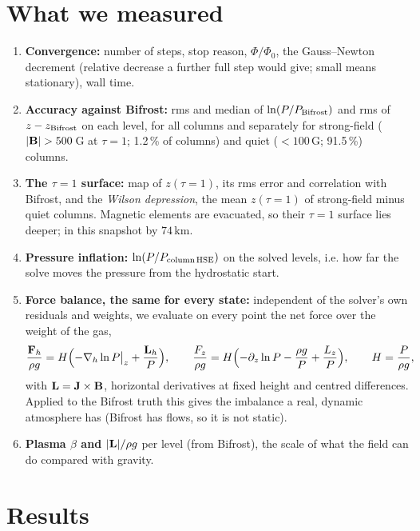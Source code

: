 \section{What we measured}
\begin{enumerate}
\item \textbf{Convergence:} number of steps, stop reason, $\Phi/\Phi_0$, the Gauss--Newton decrement (relative decrease a
further full step would give; small means stationary), wall time.
\item \textbf{Accuracy against Bifrost:} rms and median of $\ln(P/P_{\rm Bifrost})$ and rms of $z-z_{\rm Bifrost}$ on each
level, for all columns and separately for strong-field ($|\B|>500$\,G at $\tau=1$; 1.2\,\% of columns) and quiet
($<100$\,G; 91.5\,\%) columns.
\item \textbf{The $\tau=1$ surface:} map of $z(\tau=1)$, its rms error and correlation with Bifrost, and the \emph{Wilson
depression}, the mean $z(\tau=1)$ of strong-field minus quiet columns. Magnetic elements are evacuated, so their $\tau=1$
surface lies deeper; in this snapshot by $74$\,km.
\item \textbf{Pressure inflation:} $\ln(P/P_{\rm column\,HSE})$ on the solved levels, i.e. how far the solve moves the
pressure from the hydrostatic start.
\item \textbf{Force balance, the same for every state:} independent of the solver's own residuals and weights, we evaluate
on every point the net force over the weight of the gas,
\begin{equation}
\frac{\mathbf F_h}{\rho g}=H\Bigl(-\nabla_h\ln P\big|_z+\frac{\mathbf L_h}{P}\Bigr),\qquad
\frac{F_z}{\rho g}=H\Bigl(-\partial_z\ln P-\frac{\rho g}{P}+\frac{L_z}{P}\Bigr),\qquad H=\frac{P}{\rho g},
\end{equation}
with $\mathbf L=\mathbf J\times\mathbf B$, horizontal derivatives at fixed height and centred differences. Applied to the Bifrost truth this gives
the imbalance a real, dynamic atmosphere has (Bifrost has flows, so it is not static).
\item \textbf{Plasma $\beta$ and $|\mathbf L|/\rho g$} per level (from Bifrost), the scale of what the field can do compared with
gravity.
\end{enumerate}

\section{Results}
